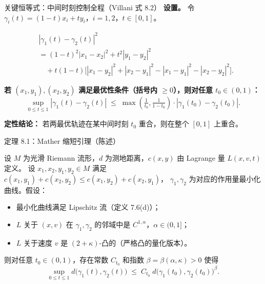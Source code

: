 \begin{frame}{关键恒等式：中间时刻控制全程（Villani 式 8.2）}
  \textbf{设置。} 令 $\gamma_{i}(t)=(1-t)x_{i}+ty_{i}$，$i=1,2$，$t\in[0,1]$。

  \begin{align*}
    &|\gamma_{1}(t)-\gamma_{2}(t)|^{2} \\
    &= (1-t)^{2}|x_{1}-x_{2}|^{2}+t^{2}|y_{1}-y_{2}|^{2} \\
    &\quad+t(1-t)\bigl[|x_{1}-y_{2}|^{2}+|x_{2}-y_{1}|^{2}-|x_{1}-y_{1}|^{2}-|x_{2}-y_{2}|^{2}\bigr].
  \end{align*}

  \textbf{若 $(x_1,y_1),(x_2,y_2)$ 满足最优性条件（括号内 $\ge 0$），则对任意 $t_0\in(0,1)$：}
  \[
    \sup_{0\le t\le 1}|\gamma_{1}(t)-\gamma_{2}(t)|
    \;\le\; \max\!\left(\tfrac{1}{t_{0}},\tfrac{1}{1-t_{0}}\right)
    \cdot|\gamma_{1}(t_{0})-\gamma_{2}(t_{0})|.
  \]

  \textbf{定性结论：} 若两最优轨迹在某中间时刻 $t_0$ 重合，则在整个 $[0,1]$ 上重合。

\end{frame}

\begin{frame}{定理 8.1：Mather 缩短引理（陈述）}

  设 $M$ 为光滑 Riemann 流形，$d$ 为测地距离，$c(x,y)$ 由 Lagrange 量 $L(x,v,t)$ 定义。
  设 $x_{1},x_{2},y_{1},y_{2}\in M$ 满足 $c(x_{1},y_{1})+c(x_{2},y_{2})\le c(x_{1},y_{2})+c(x_{2},y_{1})$，
  $\gamma_{1},\gamma_{2}$ 为对应的作用量最小化曲线。假设：

  \begin{itemize}\small
    \item[(i)] 最小化曲线满足 Lipschitz 流（定义 7.6(d)）；
    \item[(ii)] $L$ 关于 $(x,v)$ 在 $\gamma_1,\gamma_2$ 的邻域中是 $C^{1,\alpha}$，$\alpha\in(0,1]$；
    \item[(iii)] $L$ 关于速度 $v$ 是 $(2+\kappa)$-凸的（严格凸的量化版本）。
  \end{itemize}

  则对任意 $t_{0}\in(0,1)$，存在常数 $C_{t_{0}}$ 和指数 $\beta=\beta(\alpha,\kappa)>0$ 使得
  \[
    \sup_{0\le t\le 1}d\!\bigl(\gamma_{1}(t),\gamma_{2}(t)\bigr)
    \;\le\; C_{t_{0}}\;d\!\bigl(\gamma_{1}(t_{0}),\gamma_{2}(t_{0})\bigr)^{\beta}.
  \]

\end{frame}

